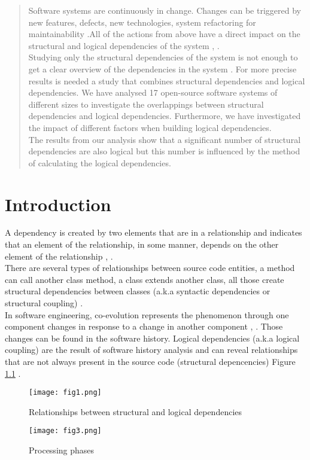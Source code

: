\documentclass[12pt,a4paper,oneside]{report}
\begin{document}



\tableofcontents
\newpage
\begin{abstract}
Software systems are continuously in change. Changes can be triggered by new features, defects, new technologies, system refactoring for maintainability \cite{ct1}.All of the actions from above have a direct impact on the structural and logical dependencies of the system \cite{ct8}, \cite{ct6}.\\Studying only the structural dependencies of the system is not enough to get a clear overview of the dependencies in the system . For more precise results is needed a study that combines structural dependencies and logical dependencies. We have analysed 17 open-source software systems of different sizes to investigate the overlappings between structural dependencies and logical dependencies. Furthermore, we have investigated the impact of different factors when building logical dependencies.\\The results from our analysis show that a significant number of structural dependencies are also logical but this number is influenced by the method of calculating the logical dependencies.
\end{abstract}
\newpage
\chapter{Introduction}
A dependency is created by two elements that are in a relationship and indicates that an element of the relationship, in some manner, depends on the other element of the relationship \cite{ct2}, \cite{ct3}. \\There are several types of relationships between source code entities, a method can call another class method, a class extends another class, all those create structural dependencies between classes (a.k.a syntactic dependencies or structural coupling) \cite{ct4}.\\In software engineering, co-evolution represents the phenomenon through one component changes in response to a change in another component \cite{ct6}, \cite{ct5}. Those changes can be found in the software history. Logical dependencies (a.k.a logical coupling) are the result of software history analysis and can reveal relationships that are not always present in the source code (structural depencencies)  Figure \ref{fig:fig1} .
\begin{figure}[h]
\texttt{[image: fig1.png]}
\caption{Relationships between structural and logical dependencies }
\label{fig:fig1}
\centering
\end{figure}
\begin{figure*}[h]
\centering
\texttt{[image: fig3.png]}
\caption{Processing phases}
\label{fig:fig3}
\end{figure*}
\end{document}
